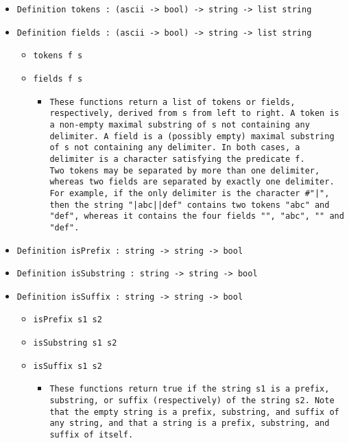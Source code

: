 \documentclass[11pt]{report}
\begin{document}
\begin{itemize}
\begin{itemize}
\end{itemize}

\item  \texttt{Definition tokens : (ascii -> bool) -> string -> list string}

\item  \texttt{Definition fields : (ascii -> bool) -> string -> list string}

\begin{itemize}
\item  \texttt{tokens f s}

\item  \texttt{fields f s}

\begin{itemize}
\item  \begin{flushleft} \texttt{These functions return a list of tokens or fields, respectively, derived from s from left to right. A token is a non-empty maximal substring of s not containing any delimiter. A field is a (possibly empty) maximal substring of s not containing any delimiter. In both cases, a delimiter is a character satisfying the predicate f.\\
\coqdocemptyline
Two tokens may be separated by more than one delimiter, whereas two fields are separated by exactly one delimiter. For example, if the only delimiter is the character  \#"|", then the string "|abc||def" contains two tokens "abc" and "def", whereas it contains the four fields "", "abc", "" and "def".}  \end{flushleft}
\end{itemize}

\end{itemize}

\item \texttt{Definition isPrefix : string -> string -> bool}
\item \texttt{Definition isSubstring : string -> string -> bool}
\item \texttt{Definition isSuffix : string -> string -> bool}

\begin{itemize}
\item \texttt{isPrefix s1 s2}
\item \texttt{isSubstring s1 s2}
\item \texttt{isSuffix s1 s2 }

\begin{itemize}
\item \begin{flushleft} \texttt{These functions return true if the string s1 is a prefix, substring, or suffix (respectively) of the string s2. Note that the empty string is a prefix, substring, and suffix of any string, and that a string is a prefix, substring, and suffix of itself.}\end{flushleft}
\end{itemize}


\end{itemize}
\end{itemize}
\end{document}
